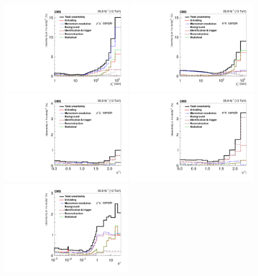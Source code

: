 \begin{figure}
	\centering
	\includegraphics[width=0.49\textwidth]{figures/zpt/histoUnfolding_XSRatioSystPt_nsel0_dy3.pdf}
        \includegraphics[width=0.49\textwidth]{figures/zpt/histoUnfolding_XSRatioSystPt_nsel1_dy3.pdf}
	\includegraphics[width=0.49\textwidth]{figures/zpt/histoUnfolding_XSRatioSystRap_nsel0_dy3.pdf}
        \includegraphics[width=0.49\textwidth]{figures/zpt/histoUnfolding_XSRatioSystRap_nsel1_dy3.pdf}
	\includegraphics[width=0.49\textwidth]{figures/zpt/histoUnfolding_XSRatioSystPhiStar_nsel0_dy3.pdf}

\end{figure}
